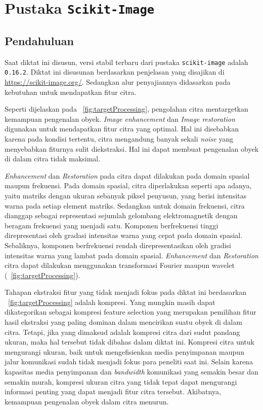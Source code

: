 \chapter{Pustaka \texttt{Scikit-Image}}
\section{Pendahuluan}

Saat diktat ini disusun, versi stabil terbaru dari pustaka \texttt{scikit-image} adalah \texttt{0.16.2}. Diktat ini disusunan berdasarkan penjelasan yang disajikan di \url{https://scikit-image.org/}. Sedangkan alur penyajiannya didasarkan pada kebutuhan untuk mendapatkan fitur citra.

Seperti dijelaskan \cite{Gonzalez} pada \figurename~\ref{fig:targetProcessing}, pengolahan citra mentargetkan kemampuan pengenalan obyek. \textit{Image enhancement} dan \textit{Image restoration} digunakan untuk mendapatkan fitur citra yang optimal. Hal ini disebabkan karena pada kondisi tertentu, citra mengandung banyak sekali \textit{noise} yang menyebabkan fiturnya sulit diekstraksi. Hal ini dapat membuat pengenalan obyek di dalam citra tidak maksimal. 

\textit{Enhancement} dan \textit{Restoration} pada citra dapat dilakukan pada domain spasial maupun frekuensi. Pada domain spasial, citra diperlakukan seperti apa adanya, yaitu matriks dengan ukuran sebanyak piksel penyusun, yang berisi intensitas warna pada setiap element matriks. Sedangkan untuk domain frekuensi, citra dianggap sebagai representasi sejumlah gelombang elektromagnetik dengan beragam frekuensi yang menjadi satu. Komponen berfrekuensi tinggi direpresentasi oleh gradasi intensitas warna yang cepat pada domain spasial. Sebaliknya, komponen berfrekuensi rendah direpresentasikan oleh gradisi intensitas warna yang lambat pada domain spasial. \textit{Enhancement} dan \textit{Restoration} citra dapat dilakukan menggunakan transformasi Fourier maupun wavelet (\figurename~\ref{fig:targetProcessing}).

Tahapan ekstraksi fitur yang tidak menjadi fokus pada diktat ini berdasarkan \figurename~\ref{fig:targetProcessing} adalah kompresi. Yang mungkin masih dapat dikategorikan sebagai kompresi feature selection yang merupakan pemilihan fitur hasil ekstraksi yang paling dominan dalam mencirikan suatu obyek di dalam citra. Tetapi, jika yang dimaksud adalah kompresi citra dari sudut pandang ukuran, maka hal tersebut tidak dibahas dalam diktat ini. Kompresi citra untuk mengurangi ukuran, baik untuk mengefisienkan media penyimpanan maupun jalur komunikasi sudah tidak menjadi fokus para peneliti saat ini. Selain karena kapasitas media penyimpanan dan \textit{bandwidth} komunikasi yang semakin besar dan semakin murah, kompresi ukuran citra yang tidak tepat dapat mengurangi informasi penting yang dapat menjadi fitur citra tersebut. Akibatnya, kemampuan pengenalan obyek dalam citra menurun.

